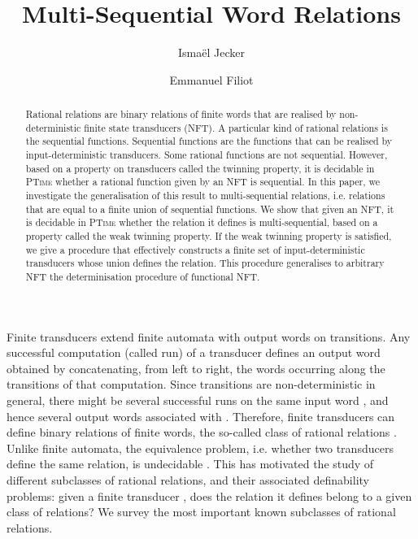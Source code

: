 \documentclass[envcountsame]{llncs}
\title{
Multi-Sequential Word Relations}
\author{
Ismaël Jecker\and
Emmanuel Filiot
}
\institute{
Université Libre de Bruxelles}
\begin{document}
\maketitle

\begin{abstract}
    Rational relations are binary relations of finite words that are
    realised by non-deterministic finite state transducers (NFT). 
    A particular kind of rational relations is the sequential
    functions. Sequential functions are the functions that can be
    realised by input-deterministic transducers. Some rational
    functions are not sequential. However, based on a property on
    transducers called the twinning property, it is decidable in
    \textsc{PTime} whether a rational function given by an NFT is
    sequential. In this paper, we investigate the
    generalisation of this result to multi-sequential relations,
    i.e. relations that are equal to a finite union of sequential
    functions. We show that given an NFT, it is decidable in
    \textsc{PTime} whether the relation it defines is
    multi-sequential, based on a property called the weak twinning
    property. If the weak twinning property is satisfied, we give a procedure that effectively
    constructs a finite set of input-deterministic transducers whose
    union defines the relation. This procedure generalises to
    arbitrary NFT the determinisation procedure of 
    functional NFT.
\end{abstract}



Finite transducers extend finite automata with 
output words on transitions. Any successful computation (called run) of a
transducer defines an output word obtained by concatenating, from
left to right, the words occurring along the transitions of that
computation. Since transitions are non-deterministic in general, there
might be several successful runs on the same input word , and hence 
several output words associated with . Therefore, finite
transducers can define binary relations of finite words, the so-called
class of rational relations \cite{Elgot:Mezei:ibmjrd:1965,berstel2009}.
Unlike finite automata, the equivalence problem, i.e. whether two transducers define the same
relation, is undecidable \cite{DBLP:journals/jacm/Griffiths68}. This has
motivated the study of different subclasses of rational relations, and
their associated definability problems: given a finite transducer ,
does the relation  it defines belong to a given class
 of relations? We survey the most
important known subclasses of rational relations. 
\end{document}
